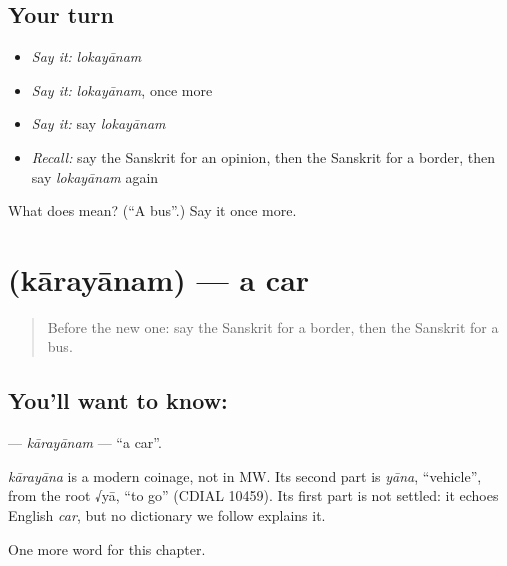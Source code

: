 \subsection*{Your turn}
\begin{itemize}
\raggedright
  \item \emph{Say it:} \emph{lokayānam}
  \item \emph{Say it:} \emph{lokayānam}, once more
  \item \emph{Say it:} say \emph{lokayānam}
  \item \emph{Recall:} say the Sanskrit for an opinion, then the Sanskrit for a border, then say \emph{lokayānam} again
\end{itemize}

\begin{tcolorbox}[breakable,colback=teal!4,colframe=teal!35!black,title={Before you move on}]
What does  mean? (\textquotedblleft{}A bus\textquotedblright{}.) Say it once more.
\end{tcolorbox}
\section[\texorpdfstring{\sk{कारयानम्} (kārayānam)}{कारयानम् (kārayānam)}]{ (kārayānam) — a car}

\label{lesson:SA-C257-karayanam}



\begin{quote}
Before the new one: say the Sanskrit for a border, then the Sanskrit for a bus.
\end{quote}

\subsection*{You'll want to know: }
\textbf{} — \emph{kārayānam} — \textquotedblleft{}a car\textquotedblright{}.

\begin{cousinweb}
\emph{kārayāna} is a modern coinage, not in MW. Its second part is \emph{yāna}, \textquotedblleft{}vehicle\textquotedblright{}, from the root √yā, \textquotedblleft{}to go\textquotedblright{} (CDIAL 10459). Its first part is not settled: it echoes English \emph{car}, but no dictionary we follow explains it.
\end{cousinweb}

\begin{grammarlens}[title={What you've built}]
One more word for this chapter.
\end{grammarlens}

